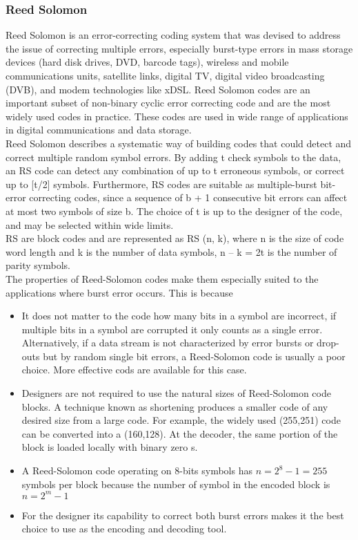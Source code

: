 \subsubsection{Reed Solomon}
Reed Solomon is an error-correcting coding system that was devised to address the issue of correcting multiple 
errors, especially burst-type errors in mass storage devices (hard disk drives, DVD, barcode tags), wireless and mobile 
communications units, satellite links, digital TV, digital video broadcasting (DVB), and modem technologies like xDSL. Reed Solomon codes are an important subset of non-binary cyclic error correcting code and are the most widely used codes in practice. These codes are  used in wide range of applications in digital communications and data  storage. \\
Reed Solomon describes a systematic  way of building codes that could detect and correct multiple random symbol errors. By adding t check symbols to the data, an RS code can detect any combination of up to t erroneous symbols, or correct up to [t/2] symbols. Furthermore, RS codes are suitable as multiple-burst bit-error correcting codes, since a sequence of b + 1 consecutive bit errors can affect at most two symbols of size b. The choice of t  is up to the designer of the code, and may be selected within wide limits.\\
RS are  block codes and are  represented as RS (n, k),  where  n is the  size  of code  word length and k is the number of data symbols, n – k = 2t is the number of parity symbols.\\
The properties of Reed-Solomon codes make them especially suited to the applications where burst error occurs. This is because
\begin{itemize}
    \item It does not matter to the code how many bits in a symbol are incorrect, if multiple bits in a symbol are corrupted it only counts as a single error. Alternatively, if a data stream is not characterized by error bursts or drop-outs but by random single bit errors, a Reed-Solomon code is usually a poor choice. More effective cods are available for this case.
    \item Designers are not required to use the natural sizes of Reed-Solomon code blocks. A technique known as shortening produces a smaller code of any desired size from a large code. For example, the widely used (255,251) code can be converted into a (160,128). At the decoder, the same portion of the block is loaded locally with binary zero
    s.
    \item A Reed-Solomon code operating on 8-bits symbols has $n=2^8-1 = 255$ symbols per block because the number of symbol in the encoded block is $n = 2^m-1$
    \item For the designer its capability to correct both burst errors makes it the best choice to use as the encoding and decoding tool.
\end{itemize}
%
%
